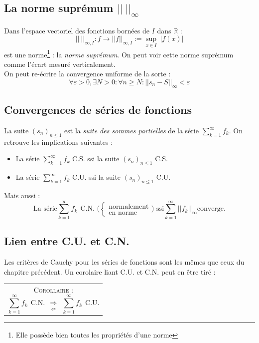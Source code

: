 \documentclass	[11pt, a4paper, openany]{book}
\newcommand{\corollaire}[1]{\ \\\begin{tabular}{|c}
\begin{minipage}{\textwidth}
  \textsc{Corollaire : } \textit{#1}
\end{minipage}
\end{tabular}}
\newcommand{\serie}{\sum_{k=1}^\infty}
\begin{document}
			\subsection{La norme suprémum $||\ ||_\infty$}
			Dans l'espace vectoriel des fonctions bornées de $I$ dans $\mathbb{R}$ :
			\begin{equation}
				||\ ||_{\infty, I} : f \rightarrow ||f||_{\infty, I} := \sup\limits_{x \in I}\ |f(x)|
			\end{equation}
			est une norme\footnote{Elle possède bien toutes les propriétés d'une norme} : la \textit{norme suprémum}. On peut voir cette norme suprémum comme l'écart mesuré verticalement. \\
			On peut re-écrire la convergence uniforme de la sorte :
			\begin{equation}
				\forall \varepsilon > 0, \exists N >0: \forall n \geq N :  ||s_n - S||_\infty < \varepsilon
			\end{equation}
			
			\setcounter{subsection}{4}
			\subsection{Convergences de séries de fonctions}
			La suite $(s_n)_{n\leq 1}$ est la \textit{suite des sommes partielles} de la série $\serie f_k$. On retrouve les implications suivantes :
			\begin{itemize}
				\item La série $\serie f_k$ C.S. ssi la suite $(s_n)_{n\leq 1}$ C.S.
				\item La série $\serie f_k$ C.U. ssi la suite $(s_n)_{n\leq 1}$ C.U. 
			\end{itemize}
			Mais aussi :
			\begin{equation}
				\text{La série} \serie f_k\ \ \text{C.N. ($\left\{\begin{array}{l}
					\text{normalement}\\
					\text{en norme}
					\end{array}\right.$) ssi} \serie ||f_k||_\infty \text{converge}.
			\end{equation}
			
			\setcounter{subsection}{6}
			\subsection{Lien entre C.U. et C.N.}
			Les critères de Cauchy pour les séries de fonctions sont les mêmes que ceux du chapitre précédent. Un corolaire liant C.U. et C.N. peut en être tiré :
			\corollaire{\begin{equation}
				\serie f_k\ \ \text{C.N.}\ \ \underset{\nLeftarrow}{\Rightarrow}\ \ \serie f_k\ \ \text{C.U.}
				\end{equation}}
			
\end{document}
